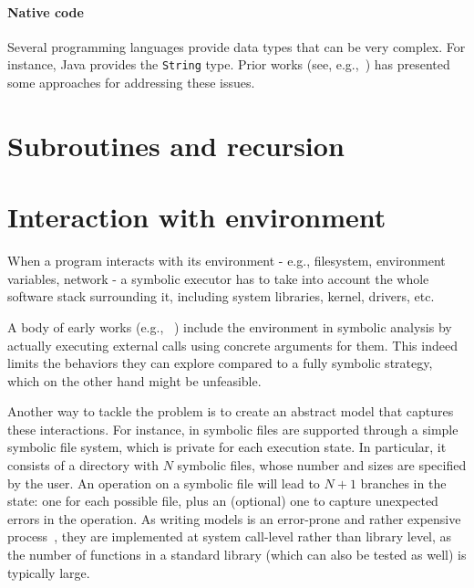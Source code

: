 \paragraph{Native code} Several programming languages provide data types that can be very complex. For instance, Java provides the {\tt String} type. Prior works (see, e.g.,~\cite{SHZ-TAIC07}) has presented some approaches for addressing these issues.


\section{Subroutines and recursion}
\label{se:recursion}


\section{Interaction with environment}

When a program interacts with its environment - e.g., filesystem, environment variables, network - a symbolic executor has to take into account the whole software stack surrounding it, including system libraries, kernel, drivers, etc.

A body of early works (e.g., ~\cite{DART-PLDI05,CUTE-FSE13,EXE-CCS06}) include the environment in symbolic analysis by actually executing external calls using concrete arguments for them. This indeed limits the behaviors they can explore compared to a fully symbolic strategy, which on the other hand might be unfeasible.

Another way to tackle the problem is to create an abstract model that captures these interactions. For instance, in \cite{KLEE-OSDI08} symbolic files are supported through a simple symbolic file system, which is private for each execution state. In particular, it consists of a directory with $N$ symbolic files, whose number and sizes are specified by the user. An operation on a symbolic file will lead to $N+1$ branches in the state: one for each possible file, plus an (optional) one to capture unexpected errors in the operation. As writing models is an error-prone and rather expensive process~\cite{Ball06}, they are implemented at system call-level rather than library level, as the number of functions in a standard library (which can also be tested as well) is typically large.





